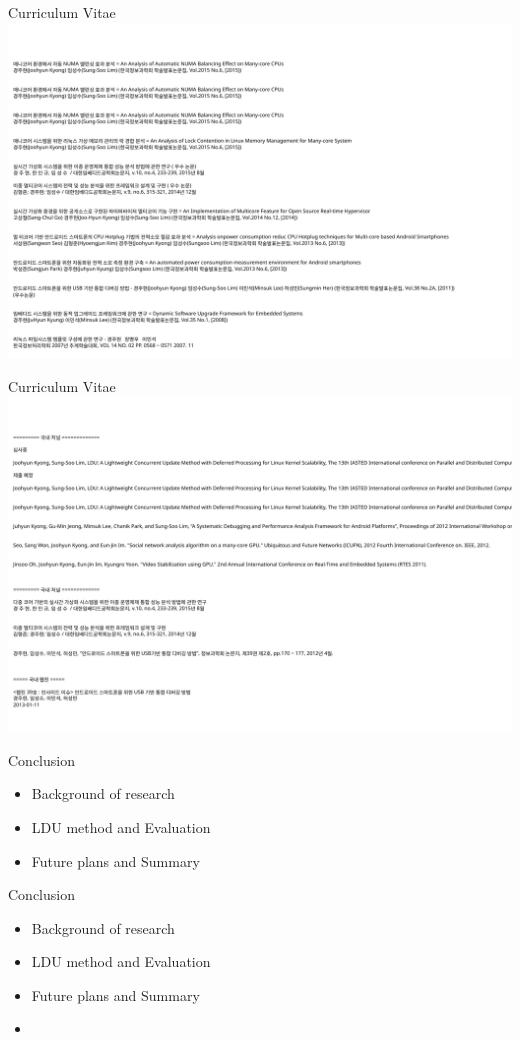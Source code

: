 \documentclass[english]{beamer} %
\begin{document}
\begin{frame}{Curriculum Vitae}
\includegraphics[scale=0.5]{cv/cv1}
\end{frame}

\begin{frame}{Curriculum Vitae}
\includegraphics[scale=0.5]{cv/cv2}

\end{frame}
\begin{frame}{Conclusion}
	\begin{itemize}
	\item Background of research 
	\item LDU method and Evaluation
	\item Future plans and Summary
	\end{itemize}
\end{frame}


\begin{frame}{Conclusion}
    \begin{itemize}
    \item Background of research 
    \item LDU method and Evaluation
    \item Future plans and Summary
    \item {}
    \end{itemize}
\end{frame}
\end{document}
